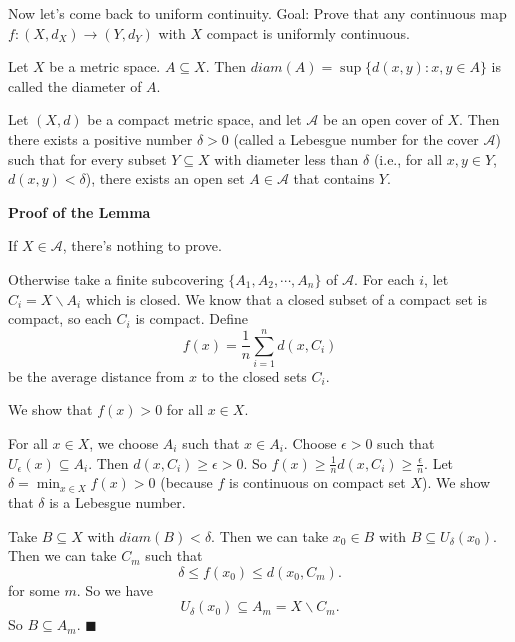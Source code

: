 \documentclass[main.tex]{subfiles}
\begin{document}
\par Now let's come back to uniform continuity. Goal: Prove that any continuous map $f: (X, d_X) \to (Y, d_Y)$ with $X$ compact is uniformly continuous. 

\begin{definition}
    Let $X$ be a metric space. $A \subseteq X$. Then $diam(A) = \sup\{d(x, y): x, y \in A\}$ is called the diameter of $A$. 
\end{definition}

\begin{lemma}
    Let $(X, d)$ be a compact metric space, and let $\mathcal{A}$ be an open cover of $X$. Then there exists a positive number $\delta > 0$ (called a Lebesgue number for the cover $\mathcal{A}$) such that for every subset $Y \subseteq X$ with diameter less than $\delta$ (i.e., for all $x, y \in Y$, $d(x, y) < \delta$), there exists an open set $A \in \mathcal{A}$ that contains $Y$.
\end{lemma}

\par \noindent \textbf{Proof of the Lemma}
\par If $X\in \mathcal{A}$, there's nothing to prove. 
\par Otherwise take a finite subcovering $\{A_1, A_2, \cdots, A_n\}$ of $\mathcal{A}$. For each $i$, let $C_i = X \backslash A_i$ which is closed. We know that a closed subset of a compact set is compact, so each $C_i$ is compact. Define 
\begin{equation}
    f(x) = \frac{1}{n} \sum_{i = 1}^{n} d(x, C_i)
\end{equation}
be the average distance from $x$ to the closed sets $C_i$. 
\par We show that $f(x) > 0$ for all $x \in X$. 
\par For all $x\in X$, we choose $A_i$ such that $x \in A_i$. Choose $\epsilon > 0$ such that $U_{\epsilon}(x) \subseteq A_i$. Then $d(x, C_i) \ge \epsilon > 0$. So $f(x) \ge \frac{1}{n} d(x, C_i) \ge \frac{\epsilon}{n}$. Let $\delta = \min_{x \in X} f(x) > 0$ (because $f$ is continuous on compact set $X$). We show that $\delta$ is a Lebesgue number. 
\par Take $B \subseteq X$ with $diam(B) < \delta$. Then we can take $x_0 \in B$ with $B \subseteq U_{\delta}(x_0)$. 
Then we can take $C_m$ such that  
\begin{equation}
    \delta  \le f(x_0) \le d(x_0, C_m).
\end{equation}
for some $m$. So we have 
\begin{equation}
    U_{\delta}(x_0) \subseteq A_m = X\backslash C_m.
\end{equation}
So $B \subseteq A_m$. \hfill $\blacksquare$
\end{document}
